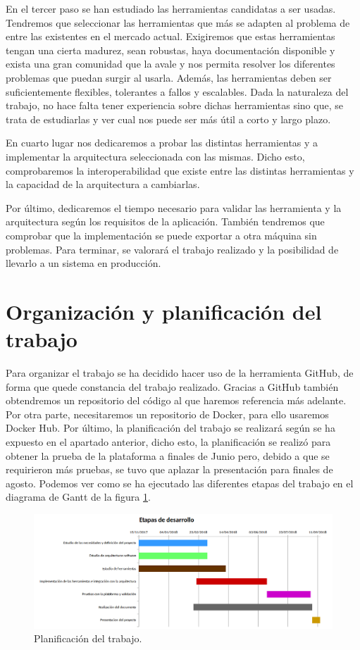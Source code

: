 En el tercer paso se han estudiado las herramientas candidatas a ser
usadas. Tendremos que seleccionar las herramientas que más se adapten
al problema de entre las existentes en el mercado actual.
Exigiremos que estas herramientas tengan una cierta madurez, sean
robustas, haya documentación disponible y exista una gran comunidad
que la avale y nos permita resolver los diferentes problemas que
puedan surgir al usarla. Además, las herramientas deben ser
suficientemente flexibles, tolerantes a fallos y escalables. Dada la
naturaleza del trabajo, no hace falta tener experiencia sobre dichas
herramientas sino que, se trata de estudiarlas y ver cual nos puede
ser más útil a corto y largo plazo.

En cuarto lugar nos dedicaremos a probar las distintas herramientas y
a implementar la arquitectura seleccionada con las mismas. Dicho esto,
comprobaremos la interoperabilidad que existe entre las distintas
herramientas y la capacidad de la arquitectura a cambiarlas.


Por último, dedicaremos el tiempo necesario para validar las
herramienta y la arquitectura según los requisitos de la aplicación.
También tendremos que comprobar que la implementación se puede
exportar a otra máquina sin problemas. Para terminar, se valorará el
trabajo realizado y la posibilidad de llevarlo a un sistema en
producción.

\section{Organización y planificación del trabajo\label{planificacion}}

Para organizar el trabajo se ha decidido hacer uso de la herramienta
GitHub, de forma que quede constancia del trabajo realizado. Gracias a
GitHub también obtendremos un repositorio del código al que haremos
referencia más adelante. Por otra parte, necesitaremos un repositorio
de Docker, para ello usaremos Docker Hub. Por último, la planificación
del trabajo se realizará según se ha expuesto en el apartado anterior,
dicho esto, la planificación se realizó para obtener la prueba de la 
plataforma a finales de Junio pero, debido a que se requirieron más
pruebas, se tuvo que aplazar la presentación para finales de
agosto. Podemos ver como se ha ejecutado las diferentes etapas del
trabajo en el diagrama de Gantt de la figura \ref{etapas}.

\begin{figure}[htp]
\centering
\includegraphics[scale=0.57]{Imagenes/Etapasv2.png}
\caption{Planificación del trabajo.}
\label{etapas}
\end{figure}



